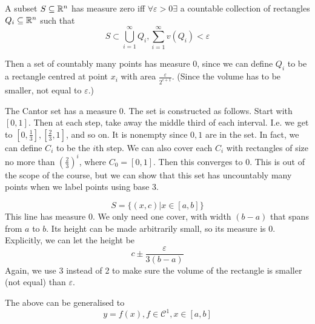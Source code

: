 \documentclass[12pt]{article}
\begin{document}
\begin{defn}
    A subset $S \subseteq \mathbb{R}^n$ has measure zero iff $\forall \varepsilon > 0 \exists$ a countable collection of rectangles $Q_i \subseteq \mathbb{R}^n$ such that
    $$S \subset \bigcup_{i=1}^\infty Q_i, \sum_{i=1}^\infty v(Q_i) < \varepsilon$$
\end{defn}

Then a set of countably many points has measure 0, since we can define $Q_i$ to be a rectangle centred at point $x_i$ with area $\frac{\varepsilon}{2^{i+1}}$. (Since the volume has to be smaller, not equal to $\varepsilon$.)

\begin{ex}
    The Cantor set has a measure 0. The set is constructed as follows. Start with $[0,1]$. Then at each step, take away the middle third of each interval. I.e. we get to $\left[0, \frac{1}{3}\right], \left[\frac{2}{3}, 1\right]$, and so on. It is nonempty since $0,1$ are in the set. In fact, we can define $C_i$ to be the $i$th step. We can also cover each $C_i$ with rectangles of size no more than $\left(\frac{2}{3}\right)^i$, where $C_0 = [0,1]$. Then this converges to 0. This is out of the scope of the course, but we can show that this set has uncountably many points when we label points using base 3.
\end{ex}

\begin{ex}
    $$S = \{(x,c)|x \in [a, b]\}$$
    This line has measure 0. We only need one cover, with width $(b-a)$ that spans from $a$ to $b$. Its height can be made arbitrarily small, so its measure is 0. Explicitly, we can let the height be
    $$c\pm\frac{\varepsilon}{3(b-a)}$$
    Again, we use 3 instead of 2 to make sure the volume of the rectangle is smaller (not equal) than $\varepsilon$.
\end{ex}

The above can be generalised to
$$y = f(x), f\in \mathcal C^1, x \in [a,b]$$
\end{document}
